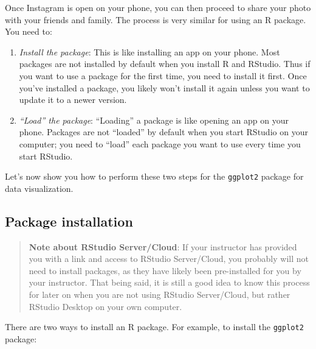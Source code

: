 \documentclass[
  letterpaper,
  DIV=11,
  numbers=noendperiod]{scrreprt}
\theoremstyle{definition}
\theoremstyle{remark}
\begin{document}
Once Instagram is open on your phone, you can then proceed to share your
photo with your friends and family. The process is very similar for
using an R package. You need to:

\begin{enumerate}
\def\labelenumi{\arabic{enumi}.}
\item
  \emph{Install the package}: This is like installing an app on your
  phone. Most packages are not installed by default when you install R
  and RStudio. Thus if you want to use a package for the first time, you
  need to install it first. Once you've installed a package, you likely
  won't install it again unless you want to update it to a newer
  version.
\item
  \emph{``Load'' the package}: ``Loading'' a package is like opening an
  app on your phone. Packages are not ``loaded'' by default when you
  start RStudio on your computer; you need to ``load'' each package you
  want to use every time you start RStudio.
\end{enumerate}

Let's now show you how to perform these two steps for the
\texttt{ggplot2} package for data visualization.

\hypertarget{sec-package-installation}{%
\subsection{Package installation}\label{sec-package-installation}}

\begin{quote}
\textbf{Note about RStudio Server/Cloud}: If your instructor has
provided you with a link and access to RStudio Server/Cloud, you
probably will not need to install packages, as they have likely been
pre-installed for you by your instructor. That being said, it is still a
good idea to know this process for later on when you are not using
RStudio Server/Cloud, but rather RStudio Desktop on your own computer.
\end{quote}

There are two ways to install an R package. For example, to install the
\texttt{ggplot2} package:
\end{document}

